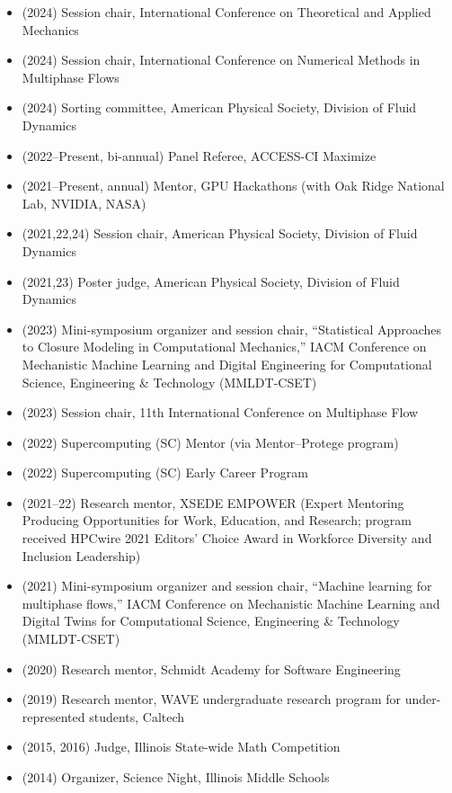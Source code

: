 \begin{itemize}
    \item (2024) Session chair, International Conference on Theoretical and Applied Mechanics
    \item (2024) Session chair, International Conference on Numerical Methods in Multiphase Flows
    \item (2024) Sorting committee, American Physical Society, Division of Fluid Dynamics
    \item (2022--Present, bi-annual) Panel Referee, ACCESS-CI Maximize
    \item (2021--Present, annual) Mentor, GPU Hackathons (with Oak Ridge National Lab, NVIDIA, NASA)
    \item (2021,22,24) Session chair, American Physical Society, Division of Fluid Dynamics
    \item (2021,23) Poster judge, American Physical Society, Division of Fluid Dynamics
    \item (2023) Mini-symposium organizer and session chair, ``Statistical Approaches to Closure Modeling in Computational Mechanics,'' IACM Conference on Mechanistic Machine Learning and Digital Engineering for Computational Science, Engineering \& Technology (MMLDT-CSET)
    \item (2023) Session chair, 11th International Conference on Multiphase Flow
    \item (2022) Supercomputing (SC) Mentor (via Mentor--Protege program)
    \item (2022) Supercomputing (SC) Early Career Program

    \item (2021--22) Research mentor, XSEDE EMPOWER (Expert Mentoring Producing Opportunities for Work, Education, and Research; program received HPCwire 2021 Editors' Choice Award in Workforce Diversity and Inclusion Leadership)
    \item (2021) Mini-symposium organizer and session chair, ``Machine learning for multiphase flows,'' IACM Conference on Mechanistic Machine Learning and Digital Twins for Computational Science, Engineering \& Technology (MMLDT-CSET)
    \item (2020) Research mentor, Schmidt Academy for Software Engineering
    \item (2019) Research mentor, WAVE undergraduate research program for under-represented students, Caltech
    \item (2015, 2016) Judge, Illinois State-wide Math Competition
    \item (2014) Organizer, Science Night, Illinois Middle Schools
\end{itemize}


